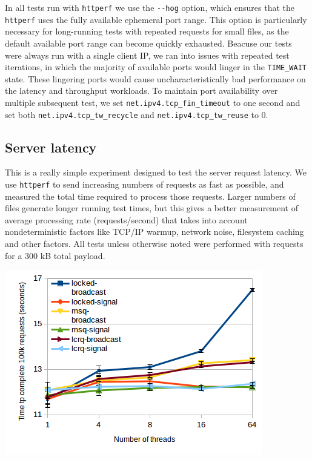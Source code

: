 \documentclass[twoside,10pt]{article}
\newenvironment{Figure}
  {\par\medskip\noindent\minipage{\linewidth}}
  {\endminipage\par\medskip}
\begin{document}
\begin{multicols}{2}
In all tests run with \verb+httperf+ we use the \verb+--hog+ option,
which ensures that the \verb+httperf+ uses the fully available
ephemeral port range. This option is particularly necessary for
long-running tests with repeated requests for small files, as the
default available port range can become quickly exhausted. Beacuse our
tests were always run with a single client IP, we ran into issues with
repeated test iterations, in which the majority of available ports
would linger in the \verb+TIME_WAIT+ state. These lingering ports
would cause uncharacteristically bad performance on the latency and
throughput workloads. To maintain port availability over multiple
subsequent test, we set \verb+net.ipv4.tcp_fin_timeout+ to one second
and set both \verb+net.ipv4.tcp_tw_recycle+ and
\verb+net.ipv4.tcp_tw_reuse+ to 0.

\subsection{Server latency}

This is a really simple experiment designed to test the server request
latency. We use \verb+httperf+ to send increasing numbers of requests
as fast as possible, and measured the total time required to process
those requests. Larger numbers of files generate longer running test
times, but this gives a better measurement of average processing rate
(requests/second) that takes into account nondeterministic factors
like TCP/IP warmup, network noise, filesystem caching and other factors. All tests unless otherwise noted were performed with requests for a 300 kB total 
payload.  

\begin{Figure}
\includegraphics[width=\linewidth]{img/latencynthreads2.png}
\end{Figure}


\end{multicols}
\end{document}
